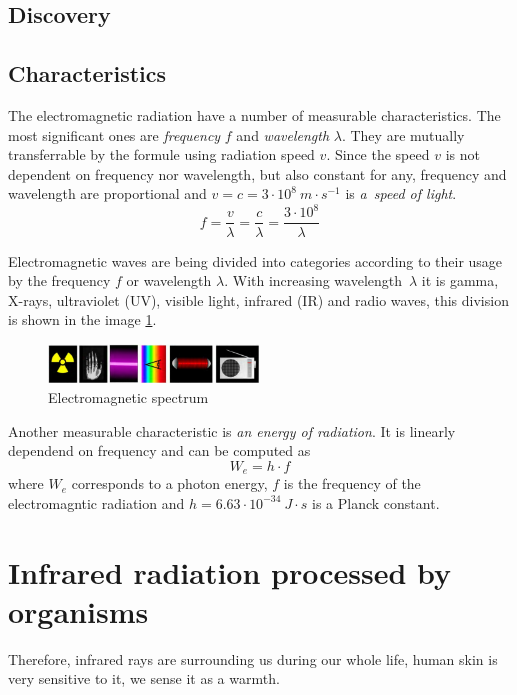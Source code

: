 \subsection*{Discovery}


\subsection*{Characteristics}
The electromagnetic radiation have a number of measurable characteristics. The most significant ones
are {\it frequency} $f$ and {\it wavelength} $\lambda$. They are mutually transferrable by the formule using
radiation speed $v$. Since the speed $v$ is not dependent on frequency nor wavelength, but also constant for any, frequency
and wavelength are proportional and $v = c=3\cdot10^{8}~m\cdot s^{-1}$ is {\it a~speed of light}.
$$f=\frac{v}{\lambda}=\frac{c}{\lambda}=\frac{3\cdot10^{8}}{\lambda}$$

Electromagnetic waves are being divided into categories according to their usage by the frequency $f$
or wavelength $\lambda$. With increasing wavelength~$\lambda$ it is gamma, X-rays, ultraviolet (UV),
visible light, infrared (IR) and radio waves, this division is shown in the image \ref{fig:spectrum}.

\begin{figure}[h!]
\begin{center}
\includegraphics[width=0.5\textwidth]{obrazky-figures/spectrum.png}
\caption{Electromagnetic spectrum\label{fig:spectrum} \cite{izgspectrum}}
\end{center}    
\end{figure}

Another measurable characteristic is {\it an energy of radiation}. It is linearly dependend on
frequency and can be computed as
$$W_e=h\cdot f$$where $W_e$ corresponds to a photon energy, $f$ is the frequency of the
electromagntic radiation and $h=6.63\cdot10^{-34}~J\cdot s $ is a Planck constant.


\section{Infrared radiation processed by organisms}
Therefore, infrared rays are surrounding us during our whole life, human skin is very sensitive to it,
we sense it as a warmth. 

